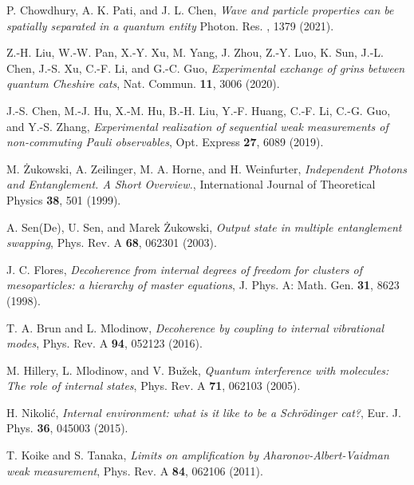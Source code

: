 \documentclass[aps,pra,showpacs,twoside,twocolumn,10pt]{revtex4-1}
\begin{document}
\begin{thebibliography}{100}
 P. Chowdhury, A. K. Pati, and J. L. Chen, \textit{Wave and particle properties can be spatially separated in a quantum entity} Photon. Res. , 1379 (2021).

 Z.-H. Liu, W.-W. Pan, X.-Y. Xu, M. Yang, J. Zhou, Z.-Y. Luo, K. Sun, J.-L. Chen, J.-S. Xu, C.-F. Li, and G.-C. Guo, \textit{Experimental exchange of grins between quantum Cheshire cats}, Nat. Commun. \textbf{11}, 3006 (2020).

 J.-S. Chen, M.-J. Hu, X.-M. Hu, B.-H. Liu, Y.-F. Huang, C.-F. Li, C.-G. Guo, and Y.-S. Zhang, \textit{Experimental realization of sequential weak measurements of non-commuting Pauli observables}, Opt. Express \textbf{27}, 6089 (2019).

 M. \.Zukowski, A. Zeilinger, M. A. Horne, and H. Weinfurter,   \textit{Independent Photons and Entanglement. A Short Overview.}, International Journal of Theoretical Physics \textbf{38}, 501 (1999). 

 A. Sen(De), U. Sen, and Marek \.Zukowski, \textit{Output state in multiple entanglement swapping}, Phys. Rev. A \textbf{68}, 062301 (2003).

 J. C. Flores, \textit{Decoherence from internal degrees of freedom for clusters of mesoparticles: a hierarchy of master equations}, J. Phys. A: Math. Gen. \textbf{31}, 8623 (1998).





 T. A. Brun and L. Mlodinow, \textit{Decoherence by coupling to internal vibrational modes}, Phys. Rev. A \textbf{94}, 052123 (2016).


 M. Hillery, L. Mlodinow, and V. Bu\v{z}ek, \textit{Quantum interference with molecules: The role of internal states}, Phys. Rev. A \textbf{71}, 062103 (2005).

 H. Nikoli\'{c}, \textit{Internal environment: what is it like to be a Schr\"{o}dinger cat?}, Eur. J. Phys. \textbf{36}, 045003 (2015).


 T. Koike and S. Tanaka, \textit{Limits on amplification by Aharonov-Albert-Vaidman weak measurement}, Phys. Rev. A \textbf{84}, 062106 (2011).










\end{thebibliography}
\end{document}
